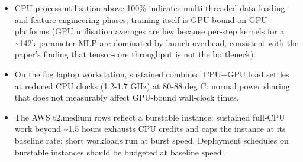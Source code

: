 \documentclass[
  9pt, a4paper, landscape]{article}
\providecommand{\tightlist}{%
  \setlength{\itemsep}{0pt}\setlength{\parskip}{0pt}}
\begin{document}
\begin{itemize}
\tightlist
\item
  CPU process utilisation above 100\% indicates multi-threaded data loading and feature engineering phases; training itself is GPU-bound on GPU platforms (GPU utilisation averages are low because per-step kernels for a \textasciitilde142k-parameter MLP are dominated by launch overhead, consistent with the paper's finding that tensor-core throughput is not the bottleneck).
\item
  On the fog laptop workstation, sustained combined CPU+GPU load settles at reduced CPU clocks (1.2-1.7 GHz) at 80-88 deg C: normal power sharing that does not measurably affect GPU-bound wall-clock times.
\item
  The AWS t2.medium rows reflect a burstable instance: sustained full-CPU work beyond \textasciitilde1.5 hours exhausts CPU credits and caps the instance at its baseline rate; short workloads run at burst speed. Deployment schedules on burstable instances should be budgeted at baseline speed.
\end{itemize}
\end{document}
